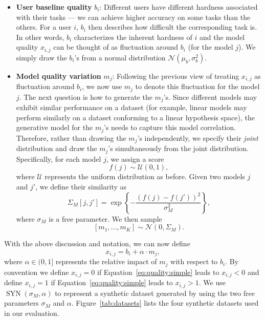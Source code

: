 \documentclass[letterpaper]{vldb}
\DeclareMathOperator{\SYN}{SYN}
\begin{document}
\vspace{-0.5em}
\begin{itemize}
\item {\bf User baseline quality} $b_i$: Different users have different
      hardness associated with their tasks --- we can achieve higher accuracy on some tasks than the others.
      For a user $i$, $b_i$ then describes how difficult the corresponding task is.
      In other words, $b_i$ characterizes the inherent hardness of $i$ and the model quality $x_{i,j}$ can be thought of as fluctuation around $b_i$ (for the model $j$).
      We simply draw the $b_i$'s from a normal distribution $\mathcal{N}(\mu_b,\sigma_b^2)$.
\vspace{-0.5em}
\item {\bf Model quality variation} $m_j$: Following the previous view of treating $x_{i,j}$ as fluctuation around $b_i$, we now use $m_j$ to denote this fluctuation for the model $j$. The next question is how to generate the $m_j$'s. Since different models may exhibit similar performance on a dataset (for example, linear models may perform similarly on a dataset conforming to a linear hypothesis space), the generative model for the $m_j$'s needs to capture this model correlation.
Therefore, rather than drawing the $m_j$'s independently, we specify their \emph{joint} distribution and draw the $m_j$'s simultaneously from the joint distribution.
Specifically, for each model $j$, we assign a score 
$$f(j)\sim\mathcal{U}(0,1),$$
where $\mathcal{U}$ represents the uniform distribution as before.
Given two models $j$ and $j'$, we define their similarity as
$$\Sigma_M[j, j']=\exp \left\{-\frac{(f(j) - f(j'))^2}{\sigma_M^2} \right\},$$
where $\sigma_M$ is a free parameter. We then sample
\[
[m_1,...,m_K] \sim \mathcal{N}(0, \Sigma_M).
\]
\end{itemize}
\vspace{-0.5em}

With the above discussion and notation, we can now define
\begin{equation}\label{eq:quality:simple}
x_{i,j} = b_i + \alpha\cdot m_j,
\end{equation}
where $\alpha\in(0,1]$ represents the relative impact of $m_j$ with respect to $b_i$.
By convention we define $x_{i,j}=0$ if Equation~\ref{eq:quality:simple} leads to $x_{i,j}<0$ and define $x_{i,j}=1$ if Equation~\ref{eq:quality:simple} leads to $x_{i,j}>1$.
We use $\SYN(\sigma_M, \alpha)$ to represent a synthetic dataset generated by using the two free parameters $\sigma_M$ and $\alpha$.
Figure~\ref{tab:datasets} lists the four synthetic datasets used in our evaluation. %
\end{document}
